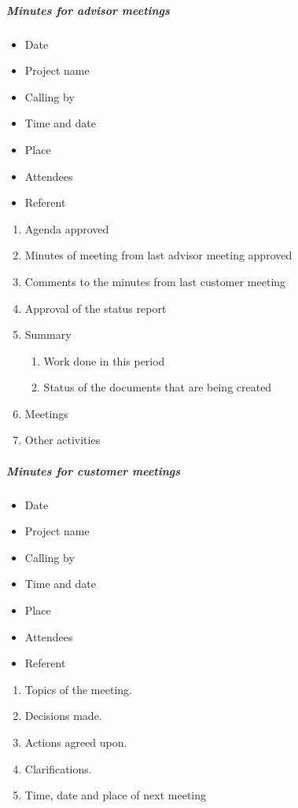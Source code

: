 \subparagraph{Minutes for advisor meetings} \hfill
\newline
\begin{itemize}
\item{}Date
\item{}Project name
\item{}Calling by
\item{}Time and date 
\item{}Place 
\item{}Attendees 
\item{}Referent
\end{itemize}

\begin{enumerate}
\item{}Agenda approved
\item{}Minutes of meeting from last advisor meeting approved 
\item{}Comments to the minutes from last customer meeting
\item{}Approval of the status report
\item{}Summary
\begin{enumerate}
\item{}Work done in this period
\item{}Status of the documents that are being created
\end{enumerate}
\item{}Meetings
\item{}Other activities
\end{enumerate}

\subparagraph{Minutes for customer meetings} \hfill
\newline
\begin{itemize}
\item{}Date
\item{}Project name
\item{}Calling by
\item{}Time and date 
\item{}Place 
\item{}Attendees 
\item{}Referent
\end{itemize}

\begin{enumerate}
\item{}Topics of the meeting.
\item{}Decisions made.
\item{}Actions agreed upon.
\item{}Clarifications.
\item{}Time, date and place of next meeting
\end{enumerate}

